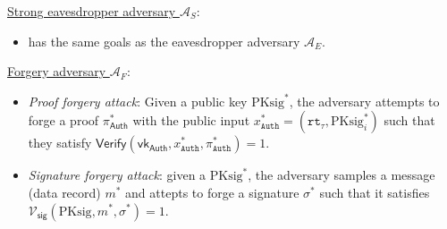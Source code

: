 \noindent \underline{Strong eavesdropper adversary  $\mathcal{A}_S$}:
\begin{itemize}
\item has the same goals as the eavesdropper adversary  $\mathcal{A}_E$.
\end{itemize}

\noindent \underline{Forgery adversary $\mathcal{A}_F$}:
\begin{itemize}
	\item \textit{Proof forgery attack}: Given a public key $\text{PKsig}^\ast$, the adversary attempts to forge a proof $\pi_\mathsf{Auth}^\ast$ with the public input $x^\ast_\texttt{Auth} = (\texttt{rt}_\tau, \text{PKsig}^\ast_{i})$ such that they satisfy $\mathsf{Verify}(\mathsf{vk}_\mathsf{Auth}, x^\ast_\texttt{Auth}, \pi^\ast_\texttt{Auth}) = 1$.
	
	\item \textit{Signature forgery attack}: given a $\text{PKsig}^\ast$, the adversary samples a message (data record) $m^\ast$ and attepts to forge a signature $\sigma^\ast$ such that it satisfies $\mathcal{V}_\mathsf{sig}(\text{PKsig}, m^\ast, \sigma^\ast) = 1$.
\end{itemize}

%	
%	
%	
%	
%	
%	
%	
%	
%	

